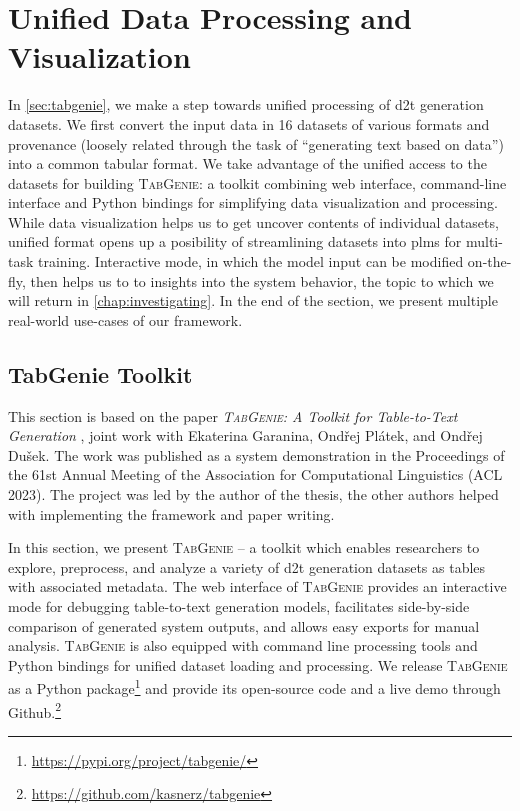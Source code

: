 
\chapter{Unified Data Processing and Visualization}
\label{chap:tabgenie}

In \autoref{sec:tabgenie}, we make a step towards unified processing of \ac{d2t} generation datasets. We first convert the input data in 16 datasets of various formats and provenance (loosely related through the task of ``generating text based on data'') into a common tabular format. We take advantage of the unified access to the datasets for building \textsc{TabGenie}: a toolkit combining web interface, command-line interface and Python bindings for simplifying data visualization and processing. While data visualization helps us to get uncover contents of individual datasets, unified format opens up a posibility of streamlining datasets into \acp{plm} for multi-task training. Interactive mode, in which the model input can be modified on-the-fly, then helps us to to insights into the system behavior, the topic to which we will return in \autoref{chap:investigating}. In the end of the section, we present multiple real-world use-cases of our framework.


\section{TabGenie Toolkit}
\label{sec:tabgenie}

\begin{refbox}
    This section is based on the paper \emph{\textsc{TabGenie}: A Toolkit for Table-to-Text Generation} \cite{kasnerTabGenieToolkitTabletoText2023}, joint work with Ekaterina Garanina, Ondřej Plátek, and Ondřej Dušek. The work was published as a system demonstration in the Proceedings of the 61st Annual Meeting of the Association for Computational Linguistics (ACL 2023). The project was led by the author of the thesis, the other authors helped with implementing the framework and paper writing.
\end{refbox}


In this section, we present \textsc{TabGenie} -- a toolkit which enables researchers to explore, preprocess, and analyze a variety of \ac{d2t} generation datasets as tables with associated metadata. The web interface of \textsc{TabGenie} provides an interactive mode for debugging table-to-text generation models, facilitates side-by-side comparison of generated system outputs, and allows easy exports for manual analysis. \textsc{TabGenie} is also equipped with command line processing tools and Python bindings for unified dataset loading and processing. We release \textsc{TabGenie} as a Python package\footnote{\url{https://pypi.org/project/tabgenie/}} and provide its open-source code and a live demo through Github.\footnote{\url{https://github.com/kasnerz/tabgenie}}

